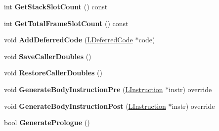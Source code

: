 \begin{DoxyCompactItemize}
\item 
int {\bfseries Get\+Stack\+Slot\+Count} () const \hypertarget{classv8_1_1internal_1_1_l_code_gen_ae997141e779eee569145e6d5f4326745}{}\label{classv8_1_1internal_1_1_l_code_gen_ae997141e779eee569145e6d5f4326745}

\item 
int {\bfseries Get\+Total\+Frame\+Slot\+Count} () const \hypertarget{classv8_1_1internal_1_1_l_code_gen_a7e0a34008896a2d4d09dab6f216df9cc}{}\label{classv8_1_1internal_1_1_l_code_gen_a7e0a34008896a2d4d09dab6f216df9cc}

\item 
void {\bfseries Add\+Deferred\+Code} (\hyperlink{classv8_1_1internal_1_1_l_deferred_code}{L\+Deferred\+Code} $\ast$code)\hypertarget{classv8_1_1internal_1_1_l_code_gen_a136807d3acd05ca71821c19ab49ef581}{}\label{classv8_1_1internal_1_1_l_code_gen_a136807d3acd05ca71821c19ab49ef581}

\item 
void {\bfseries Save\+Caller\+Doubles} ()\hypertarget{classv8_1_1internal_1_1_l_code_gen_a668f6d1f7c5aaf43fbfce22898808064}{}\label{classv8_1_1internal_1_1_l_code_gen_a668f6d1f7c5aaf43fbfce22898808064}

\item 
void {\bfseries Restore\+Caller\+Doubles} ()\hypertarget{classv8_1_1internal_1_1_l_code_gen_a094ae8da5b8b7b7d12990d25a4db2272}{}\label{classv8_1_1internal_1_1_l_code_gen_a094ae8da5b8b7b7d12990d25a4db2272}

\item 
void {\bfseries Generate\+Body\+Instruction\+Pre} (\hyperlink{classv8_1_1internal_1_1_l_instruction}{L\+Instruction} $\ast$instr) override\hypertarget{classv8_1_1internal_1_1_l_code_gen_a85d4251ce8010cd6b04358d6f54e1d13}{}\label{classv8_1_1internal_1_1_l_code_gen_a85d4251ce8010cd6b04358d6f54e1d13}

\item 
void {\bfseries Generate\+Body\+Instruction\+Post} (\hyperlink{classv8_1_1internal_1_1_l_instruction}{L\+Instruction} $\ast$instr) override\hypertarget{classv8_1_1internal_1_1_l_code_gen_aad9fc88d51d97648fb770f64ef370b57}{}\label{classv8_1_1internal_1_1_l_code_gen_aad9fc88d51d97648fb770f64ef370b57}

\item 
bool {\bfseries Generate\+Prologue} ()\hypertarget{classv8_1_1internal_1_1_l_code_gen_aff05496f75e5706dc01028ef21cd2065}{}\label{classv8_1_1internal_1_1_l_code_gen_aff05496f75e5706dc01028ef21cd2065}


\end{DoxyCompactItemize}
